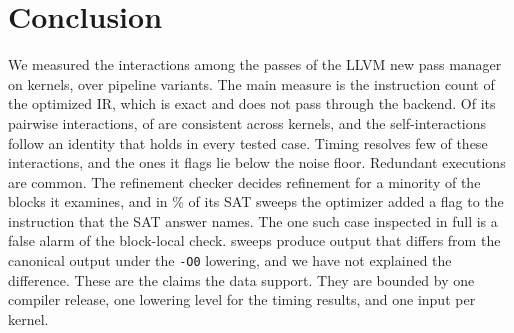 \section{Conclusion}

We measured the interactions among the passes of the LLVM new pass manager on \NumKernels{} kernels, over \NumSweeps{} pipeline
variants. The main measure is the instruction count of the optimized IR, which is exact and does not pass through the backend. Of
its pairwise interactions, \InstInteractionConsistentCells{} of \InstInteractionCells{} are consistent across kernels, and the
self-interactions follow an identity that holds in every tested case. Timing resolves few of these interactions,
and the ones it flags lie below the noise floor. Redundant executions are common. The refinement checker decides refinement for a
minority of the blocks it examines, and in \WitnessGainSweepsPct{}\% of its SAT sweeps the optimizer added a flag to the instruction
that the SAT answer names. The one such case inspected in full is a false alarm of the block-local check. \OutputsDiffering{} sweeps
produce output that differs from the canonical output under the \texttt{-O0} lowering, and we have not explained the difference.
These are the claims the data support. They are bounded by one compiler release, one lowering level for the timing
results, and one input per kernel.


